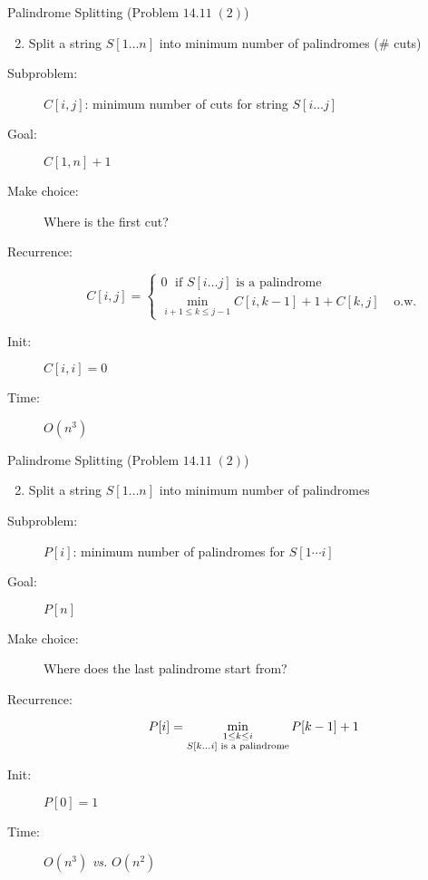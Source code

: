 \begin{frame}{}
  \begin{exampleblock}{Palindrome Splitting (Problem $14.11\; (2)$)}
    \begin{enumerate}[(1)]
      \setcounter{enumi}{1}
      \item Split a string $S[1 \dots n]$ into minimum number of palindromes (\# cuts)
    \end{enumerate}
  \end{exampleblock}

  \begin{description}
	\item[Subproblem:] $C[i,j]$: minimum number of cuts for string $S[i \dots j]$
	\item[Goal:] $C[1,n] + 1$
	  \pause
	\item[Make choice:] Where is the first cut?
	\item[Recurrence:] 
	  \[
		C[i,j] = \left\{ \begin{array}{ll}
		  0	\; \text{ if } S[i \dots j] \text{ is a palindrome} & \\
		  \min\limits_{i+1 \le k \le j-1} C[i,k-1] + 1 + C[k,j] & \text{ o.w.}
		\end{array} \right.
	  \]
	  \pause
	\item[Init:] $C[i,i] = 0$
	\item[Time:] $O(n^3)$
  \end{description}
\end{frame}
\begin{frame}{}
  \begin{exampleblock}{Palindrome Splitting (Problem $14.11\; (2)$)}
    \begin{enumerate}[(1)]
      \setcounter{enumi}{1}
      \item Split a string $S[1 \dots n]$ into minimum number of palindromes
    \end{enumerate}
  \end{exampleblock}

  \begin{description}
	\item[Subproblem:] $P[i]$: minimum number of palindromes for $S[1 \cdots i]$
	\item[Goal:] $P[n]$
	  \pause
	\item[Make choice:] Where does the last palindrome start from?
	\item[Recurrence:] 
	  \[
		P[i] = \min_{\begin{subarray}{c}
			1 \le k \le i \\
			S[k \dots i] \text{ is a palindrome}
		  \end{subarray}} P[k-1] + 1
	  \]
	  \pause
	\item[Init:] $P[0] = 1$
	\item[Time:] $O(n^3)$ \emph{vs.} $O(n^2)$
  \end{description}
\end{frame}
